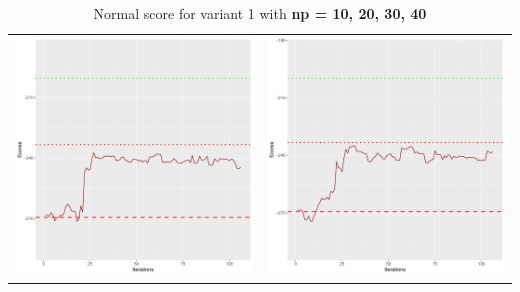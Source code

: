 \documentclass[]{scrartcl}
\begin{document}
\begin{table}[h!]
\begin{tabular}{cc}
\includegraphics[scale = 0.4]{./figs/asia/v1/30/boundsEvolution-107.pdf} & 
\includegraphics[scale = 0.4]{./figs/asia/v1/40/boundsEvolution-107.pdf} \\
\end{tabular}
\caption{Normal score for variant 1 with \textbf{np =  10, 20, 30, 40}}
\end{table}
\end{document}
